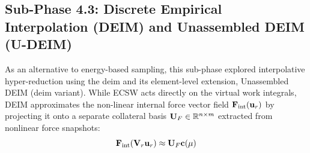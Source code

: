 \subsection{Sub-Phase 4.3: Discrete Empirical Interpolation (DEIM) and Unassembled DEIM (U-DEIM)}
\label{subsec:deim_logic}

As an alternative to energy-based sampling, this sub-phase explored interpolative hyper-reduction using the \acrlong{deim} and its element-level extension, Unassembled DEIM (\acrshort{deim} variant). While ECSW acts directly on the virtual work integrals, DEIM approximates the non-linear internal force vector field $\mathbf{F}_{\text{int}}(\mathbf{u}_r)$ by projecting it onto a separate collateral basis $\mathbf{U}_F \in \mathbb{R}^{n \times m}$ extracted from nonlinear force snapshots:
\begin{equation}
    \mathbf{F}_{\text{int}}(\mathbf{V}_r \mathbf{u}_r) \approx \mathbf{U}_F \mathbf{c}(\mathbf{\mu})
\end{equation}

